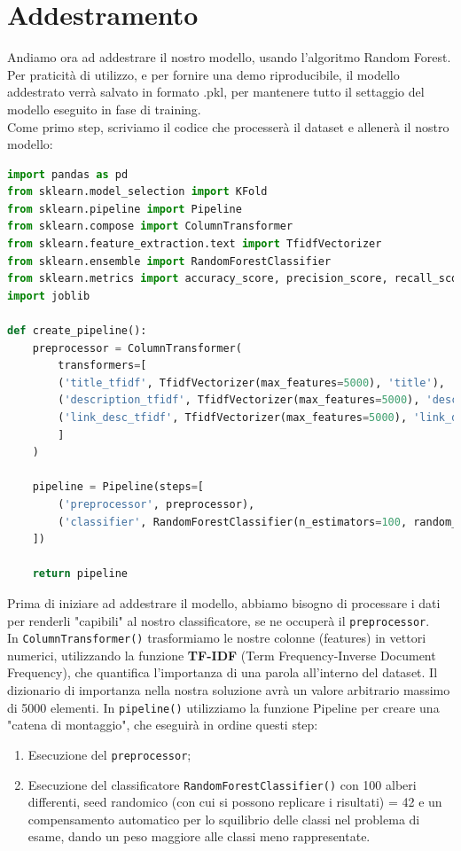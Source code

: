 \documentclass[a4paper,12pt]{report}
\begin{document}
\section{Addestramento}
Andiamo ora ad addestrare il nostro modello, usando l'algoritmo Random Forest.\\
Per praticità di utilizzo, e per fornire una demo riproducibile, il modello addestrato verrà salvato in formato .pkl, per mantenere tutto il settaggio del modello eseguito in fase di training.\\
Come primo step, scriviamo il codice che processerà il dataset e allenerà il nostro modello:
\begin{lstlisting}[language=Python]
import pandas as pd
from sklearn.model_selection import KFold
from sklearn.pipeline import Pipeline
from sklearn.compose import ColumnTransformer
from sklearn.feature_extraction.text import TfidfVectorizer
from sklearn.ensemble import RandomForestClassifier
from sklearn.metrics import accuracy_score, precision_score, recall_score, f1_score
import joblib

def create_pipeline():
    preprocessor = ColumnTransformer(
        transformers=[
        ('title_tfidf', TfidfVectorizer(max_features=5000), 'title'),
        ('description_tfidf', TfidfVectorizer(max_features=5000), 'description'),
        ('link_desc_tfidf', TfidfVectorizer(max_features=5000), 'link_desc')
        ]
    )
    
    pipeline = Pipeline(steps=[
        ('preprocessor', preprocessor),
        ('classifier', RandomForestClassifier(n_estimators=100, random_state=42, class_weight="balanced"))
    ])
    
    return pipeline
\end{lstlisting}
Prima di iniziare ad addestrare il modello, abbiamo bisogno di processare i dati per renderli "capibili" al nostro classificatore, se ne occuperà il \texttt{preprocessor}.\\
In \texttt{ColumnTransformer()} trasformiamo le nostre colonne (features) in vettori numerici, utilizzando la funzione \textbf{TF-IDF} (Term Frequency-Inverse Document Frequency), che quantifica l'importanza di una parola all'interno del dataset. Il dizionario di importanza nella nostra soluzione avrà un valore arbitrario massimo di 5000 elementi.
\newpage
In \texttt{pipeline()} utilizziamo la funzione Pipeline per creare una "catena di montaggio", che eseguirà in ordine questi step:
\begin{enumerate}
    \item Esecuzione del \texttt{preprocessor};
    \item Esecuzione del classificatore \texttt{RandomForestClassifier()} con 100 alberi differenti, seed randomico (con cui si possono replicare i risultati) = 42 e un compensamento automatico per lo squilibrio delle classi nel problema di esame, dando un peso maggiore alle classi meno rappresentate.
\end{enumerate}
\end{document}
